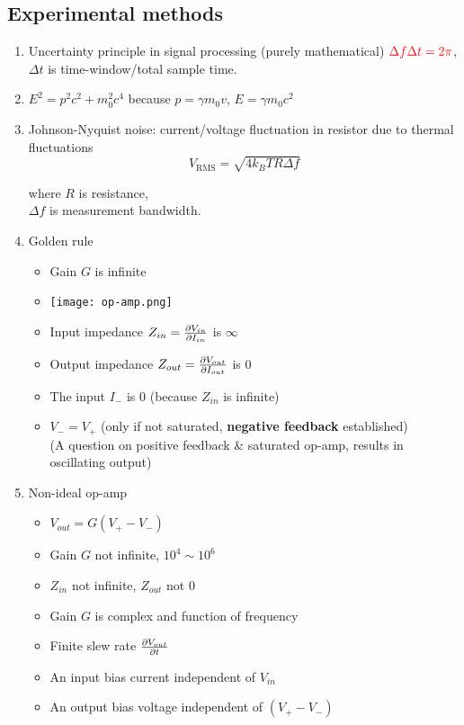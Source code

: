 \documentclass{article}
\theoremstyle{remark}
\theoremstyle{remark}
\newcommand{\where}[1]{\begin{flushright}where #1.\end{flushright}}
\begin{document}
\subsection*{Experimental methods}
\begin{enumerate}
    \item Uncertainty principle in signal processing (purely mathematical) $\textcolor{red}{\Delta f\Delta t=2\pi}$, $\Delta t$ is time-window/total sample time.
    \item $E^2=p^2c^2+m_0^2c^4$ because $p=\gamma m_0 v$, $E=\gamma m_0 c^2$
    \item Johnson-Nyquist noise: current/voltage fluctuation in resistor due to thermal fluctuations
        \[
            V_{\text{RMS}}=\sqrt{4k_BTR\Delta f}
        \]
        \where{$R$ is resistance,\\
                $\Delta f$ is measurement bandwidth}
    \item Golden rule\begin{itemize}
            \item Gain $G$ is infinite
            \item \texttt{[image: op-amp.png]}
            \item Input impedance $Z_{in}=\pdv{V_{in}}{I_{in}}$ is $\infty$
            \item Output impedance $Z_{out}=\pdv{V_{out}}{I_{out}}$ is 0
            \item The input $I_-$ is 0 (because $Z_{in}$ is infinite)
            \item $V_-=V_+$ (only if not saturated, \textbf{negative feedback} established)\\
                (A question on positive feedback \& saturated op-amp, results in oscillating output)
        \end{itemize}
    \item Non-ideal op-amp\begin{itemize}
            \item $V_{out}=G(V_+-V_-)$
            \item Gain $G$ not infinite, $10^4\sim 10^6$
            \item $Z_{in}$ not infinite, $Z_{out}$ not 0
            \item Gain $G$ is complex and function of frequency
            \item Finite slew rate $\pdv{V_{out}}{t}$
            \item An input bias current independent of $V_{in}$
            \item An output bias voltage independent of $(V_+-V_-)$

\end{itemize}
\end{enumerate}
\end{document}
